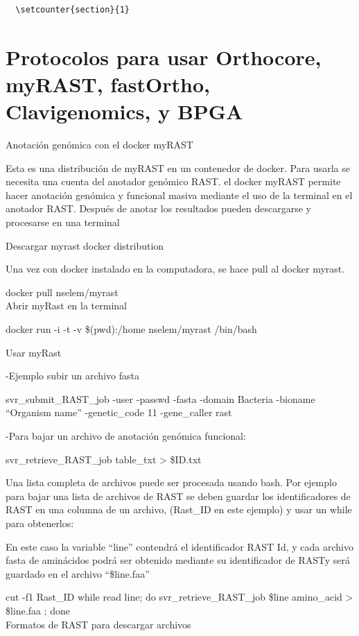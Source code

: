 \documentclass[12pt,twoside]{reedthesis}
\begin{document}
  \begin{verbatim}
  \setcounter{section}{1}
  \end{verbatim}
  
  \section{Protocolos para usar Orthocore, myRAST, fastOrtho,
  Clavigenomics, y
  BPGA}\label{protocolos-para-usar-orthocore-myrast-fastortho-clavigenomics-y-bpga}
  
  Anotación genómica con el docker myRAST
  
  Esta es una distribución de myRAST en un contenedor de docker. Para
  usarla se necesita una cuenta del anotador genómico RAST. el docker
  myRAST permite hacer anotación genómica y funcional masiva mediante el
  uso de la terminal en el anotador RAST. Después de anotar los resultados
  pueden descargarse y procesarse en una terminal
  
  Descargar myrast docker distribution
  
  Una vez con docker instalado en la computadora, se hace pull al docker
  myrast.
  
  docker pull nselem/myrast\\
  Abrir myRast en la terminal
  
  docker run -i -t -v \$(pwd):/home nselem/myrast /bin/bash
  
  Usar myRast
  
  -Ejemplo subir un archivo fasta
  
  svr\_submit\_RAST\_job -user -passwd -fasta -domain Bacteria -bioname
  ``Organism name'' -genetic\_code 11 -gene\_caller rast
  
  -Para bajar un archivo de anotación genómica funcional:
  
  svr\_retrieve\_RAST\_job table\_txt \textgreater{} \$ID.txt
  
  Una lista completa de archivos puede ser procesada usando bash. Por
  ejemplo para bajar una lista de archivos de RAST se deben guardar los
  identificadores de RAST en una columna de un archivo, (Rast\_ID en este
  ejemplo) y usar un while para obtenerlos:
  
  En este caso la variable ``line'' contendrá el identificador RAST Id, y
  cada archivo fasta de aminácidos podrá ser obtenido mediante su
  identificador de RASTy será guardado en el archivo ``\$line.faa''
  
  cut -f1 Rast\_ID \textbar{} while read line; do svr\_retrieve\_RAST\_job
  \$line amino\_acid \textgreater{} \$line.faa ; done\\
  Formatos de RAST para descargar archivos
  
\end{document}

